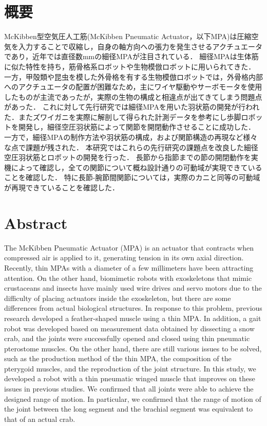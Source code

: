 \newpage
\section*{概要}
McKibben型空気圧人工筋(McKibben Pneumatic Actuator，以下MPA)は圧縮空気を入力することで収縮し，自身の軸方向への張力を発生させるアクチュエータであり，近年では直径数mmの細径MPAが注目されている．
細径MPAは生体筋に似た特性を持ち，筋骨格系ロボットや生物模倣ロボットに用いられてきた．
一方，甲殻類や昆虫を模した外骨格を有する生物模倣ロボットでは，外骨格内部へのアクチュエータの配置が困難なため，主にワイヤ駆動やサーボモータを使用したものが主流であったが，実際の生物の構成と相違点が出てきてしまう問題点があった．
これに対して先行研究では細径MPAを用いた羽状筋の開発が行われた．またズワイガニを実際に解剖して得られた計測データを参考にし歩脚ロボットを開発し，細径空圧羽状筋によって関節を開閉動作させることに成功した．
一方で，細径MPAの制作方法や羽状筋の構成，および関節構造の再現など様々な点で課題が残された．
本研究ではこれらの先行研究の課題点を改良した細径空圧羽状筋とロボットの開発を行った．
長節から指節までの節の開閉動作を実機によって確認し，全ての関節について概ね設計通りの可動域が実現できていることを確認した．
特に長節-腕節間関節については，実際のカニと同等の可動域が再現できていることを確認した．
\newpage
\section*{Abstract}
The McKibben Pneumatic Actuator (MPA) is an actuator that contracts when compressed air is applied to it, generating tension in its own axial direction.
Recently, thin MPAs with a diameter of a few millimeters have been attracting attention.
On the other hand, biomimetic robots with exoskeletons that mimic crustaceans and insects have mainly used wire drives and servo motors due to the difficulty of placing actuators inside the exoskeleton, but there are some differences from actual biological structures.
In response to this problem, previous research developed a feather-shaped muscle using a thin MPA. In addition, a gait robot was developed based on measurement data obtained by dissecting a snow crab, and the joints were successfully opened and closed using thin pneumatic pterostome muscles.
On the other hand, there are still various issues to be solved, such as the production method of the thin MPA, the composition of the pterygoid muscles, and the reproduction of the joint structure.
In this study, we developed a robot with a thin pneumatic winged muscle that improves on these issues in previous studies.
We confirmed that all joints were able to achieve the designed range of motion.
In particular, we confirmed that the range of motion of the joint between the long segment and the brachial segment was equivalent to that of an actual crab.